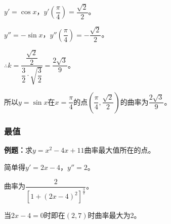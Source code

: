\documentclass[UTF8, 12pt]{ctexart}
\begin{document}
$y'=\cos x$，$y'(\dfrac{\pi}{4})=\dfrac{\sqrt{2}}{2}$。

$y''=-\sin x$，$y''(\dfrac{\pi}{4})=-\dfrac{\sqrt{2}}{2}$。

$\therefore k=\dfrac{\dfrac{\sqrt{2}}{2}}{\dfrac{3}{2}\cdot\sqrt{\dfrac{3}{2}}}=\dfrac{2\sqrt{3}}{9}$。

所以$y=\sin x$在$x=\dfrac{\pi}{4}$的点$(\dfrac{\pi}{4},\dfrac{\sqrt{2}}{2})$的曲率为$\dfrac{2\sqrt{3}}{9}$。

\subsubsection{最值}

\textbf{例题：}求$y=x^2-4x+11$曲率最大值所在的点。

简单得$y'=2x-4$，$y''=2$。

曲率为$\dfrac{2}{[1+(2x-4)^2]^{\frac{3}{2}}}$。

当$2x-4=0$时即在$(2,7)$时曲率最大为2。
\end{document}
